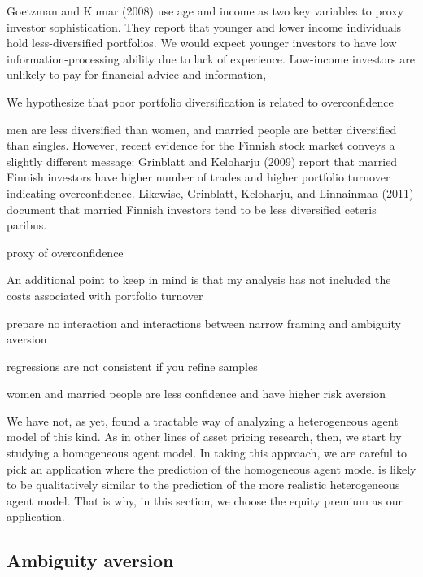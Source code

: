 \documentclass[ukenglish,nottitlepage,thmsb,11pt,letterpaper]{article}
\begin{document}
Goetzman and Kumar (2008) use age and income as two key variables to proxy investor sophistication. They report that younger and lower income individuals hold less-diversiﬁed portfolios. We would expect younger investors to have low information-processing ability due to lack of experience. Low-income investors are unlikely to pay for financial advice and information,

We hypothesize that poor portfolio diversification is related to overconfidence 
 
 men are less diversiﬁed than women, and married people are better diversiﬁed than singles. However, recent evidence for the Finnish stock market conveys a slightly different message: Grinblatt and Keloharju (2009) report that married Finnish investors have higher number of trades and higher portfolio turnover indicating overconﬁdence. Likewise, Grinblatt, Keloharju, and Linnainmaa (2011) document that married Finnish investors tend to be less diversiﬁed ceteris paribus.



proxy of overconfidence



An additional point to keep in mind is that my analysis has not included the costs associated with portfolio turnover

prepare no interaction and interactions between narrow framing and ambiguity aversion

regressions are not consistent if you refine samples

women and married people are less confidence and have higher risk aversion

We have not, as yet, found a tractable way of analyzing a heterogeneous agent model of this kind. As in other lines of
asset pricing research, then, we start by studying a homogeneous agent model. In taking this approach, we are careful to
pick an application where the prediction of the homogeneous agent model is likely to be qualitatively similar to the
prediction of the more realistic heterogeneous agent model. That is why, in this section, we choose the equity premium as
our application. 
\subsection{Ambiguity aversion}
\end{document}
